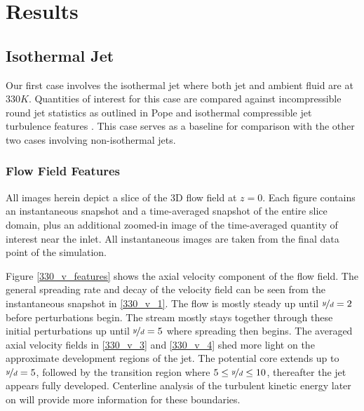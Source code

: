 \chapter{Results}

\section{Isothermal Jet}
Our first case involves the isothermal jet where both jet and ambient fluid are at $330 K$. Quantities of interest for this case are compared against incompressible round jet statistics as outlined in Pope \cite{Pope} and isothermal compressible jet turbulence features \cite{}. This case serves as a baseline for comparison with the other two cases involving non-isothermal jets. 
\subsection{Flow Field Features}
All images herein depict a slice of the 3D flow field at $z=0$. Each figure contains an instantaneous snapshot and a time-averaged snapshot of the entire slice domain, plus an additional zoomed-in image of the time-averaged quantity of interest near the inlet. All instantaneous images are taken from the final data point of the simulation.

Figure \ref{330_v_features} shows the axial velocity component of the flow field. The general spreading rate and decay of the velocity field can be seen from the instantaneous snapshot in \ref{330_v_1}. The flow is mostly steady up until $\nicefrac{y}{d}=2$ before perturbations begin. The stream mostly stays together through these initial perturbations up until $\nicefrac{y}{d}=5$ where spreading then begins. The averaged axial velocity fields in \ref{330_v_3} and \ref{330_v_4} shed more light on the approximate development regions of the jet. The potential core extends up to $\nicefrac{y}{d}=5$, followed by the transition region where $5 \leq \nicefrac{y}{d} \leq 10$, thereafter the jet appears fully developed. Centerline analysis of the turbulent kinetic energy later on will provide more information for these boundaries.  

